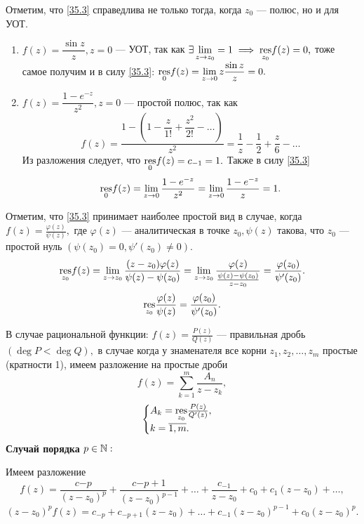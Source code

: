 \documentclass[../../main.tex]{subfiles}
\begin{document}
	Отметим, что \eqref{35.3} справедлива не только тогда, когда $z_0$ --- полюс,
	но и для УОТ.
	
		
	\begin{examples}
		\begin{enumerate}
			\item 
			$f(z) = \dfrac{\sin z}{z}, z = 0 $ --- УОТ, так как 
			$\exists \lim\limits_{z\to z_0} = 1 \implies \underset{z_0}{\operatorname{res}}f(z) = 0,$
			тоже самое получим и в силу \eqref{35.3}: 
			$\underset{0}{\operatorname{res}}f(z)= \lim\limits_{z\to 0}z \dfrac{\sin z}{z} = 0.$
			\item
			$f(z) = \dfrac{1-e^{-z}}{z^2}, z = 0$ --- простой полюс, так как 
			\[
				f(z) = \dfrac{1- \left(1-\dfrac{z}{1!}+\dfrac{z^2}{2!}-\ldots\right)}{z^2} 
				= \frac{1}{z} - \frac{1}{2} + \frac{z}{6}- \ldots
			\]
			Из разложения следует, что $\underset{0}{\operatorname{res}}f(z) = c_{-1} = 1.$ Также в 
			силу \eqref{35.3}
			\[
			\underset{0}{\operatorname{res}}f(z) = \lim_{z\to 0}\dfrac{1-e^{-z}}{z^2} =
			 \lim_{z\to 0}\dfrac{1-e^{-z}}{z} = 1.
			\]
		\end{enumerate}
	\end{examples}
	
	
	Отметим, что \eqref{35.3} принимает наиболее простой вид в случае, когда 
	$f(z) = \frac{\varphi(z)}{\psi(z)},$ где 
	$\varphi(z)$ --- аналитическая в точке $z_0, \psi(z)$ такова, что $z_0$ --- 
	простой нуль $(\psi(z_0) = 0, \psi'(z_0) \ne 0).$
	\[
		\underset{z_0}{\operatorname{res}} f(z) = \lim\limits_{z\to 
		z_0}\frac{(z-z_0)\varphi(z)}{\psi(z) - \psi(z_0)} = 
		\lim\limits_{z\to z_0}\frac{\varphi(z)}{\frac{\psi(z) - \psi(z_0)}{z - z_0}} 
		= \frac{\varphi(z_0)}{\psi'(z_0)}.
	\]
	\begin{equation}\label{35.4}
		\underset{z_0}{\operatorname{res}} \frac{\varphi(z)}{\psi(z)} = 
		\frac{\varphi(z_0)}{\psi'(z_0)}.
	\end{equation}
	
	В случае рациональной функции: $f(z) = \frac{P(z)}{Q(z)}$ --- правильная 
	дробь $(\deg P < \deg Q),$ в случае когда у знаменателя все корни $z_1, z_2, 
	\ldots, z_m$ простые (кратности 1), имеем разложение на простые дроби 
	\[
		f(z) = \sum_{k=1}^{m}\frac{A_n}{z-z_k},
	\]  
	\[
		\begin{cases}
		A_k = 	\underset{z_0}{\operatorname{res}} \frac{P(z)}{Q'(z)}, \\
		k = \overline{1, m}.
		\end{cases}
	\]
	\textbf{Случай порядка $p \in \mathbb{N}:$}
	
	Имеем разложение 
	\[
		f(z) = \frac{c{-p}}{(z-z_0)^{p}} + \frac{c{-p+1}}{(z-z_0)^{p-1}} + \ldots + 
		\frac{c_{-1}}{z-z_0} + c_0 + c_1(z-z_0) + \ldots,
	\]
	\[
		(z-z_0)^pf(z) = c_{-p} + c_{-p+1}(z-z_0) + \ldots + c_{-1}(z-z_0)^{p-1} + 
		c_0(z-z_0)^p.
	\]
	
\end{document}
